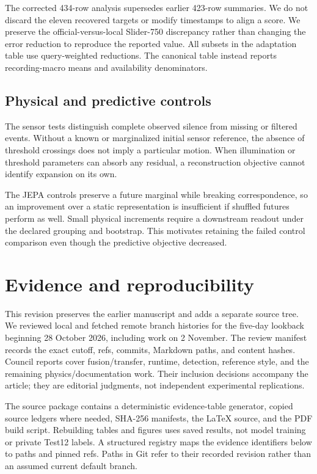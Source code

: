 \documentclass[twocolumn,letterpaper]{article}
\begin{document}
The corrected 434-row analysis supersedes earlier 423-row summaries. We do not discard the eleven recovered targets or modify timestamps to align a score. We preserve the official-versus-local Slider-750 discrepancy rather than changing the error reduction to reproduce the reported value. All subsets in the adaptation table use query-weighted reductions. The canonical table instead reports recording-macro means and availability denominators.

\subsection{Physical and predictive controls}
The sensor tests distinguish complete observed silence from missing or filtered events. Without a known or marginalized initial sensor reference, the absence of threshold crossings does not imply a particular motion. When illumination or threshold parameters can absorb any residual, a reconstruction objective cannot identify expansion on its own.

The JEPA controls preserve a future marginal while breaking correspondence, so an improvement over a static representation is insufficient if shuffled futures perform as well. Small physical increments require a downstream readout under the declared grouping and bootstrap. This motivates retaining the failed control comparison even though the predictive objective decreased.

\section{Evidence and reproducibility}
\label{app:evidence}
This revision preserves the earlier manuscript and adds a separate source tree. We reviewed local and fetched remote branch histories for the five-day lookback beginning 28 October 2026, including work on 2 November. The review manifest records the exact cutoff, refs, commits, Markdown paths, and content hashes. Council reports cover fusion/transfer, runtime, detection, reference style, and the remaining physics/documentation work. Their inclusion decisions accompany the article; they are editorial judgments, not independent experimental replications.

The source package contains a deterministic evidence-table generator, copied source ledgers where needed, SHA-256 manifests, the LaTeX source, and the PDF build script. Rebuilding tables and figures uses saved results, not model training or private Test12 labels. A structured registry maps the evidence identifiers below to paths and pinned refs. Paths in Git refer to their recorded revision rather than an assumed current default branch.
\end{document}
